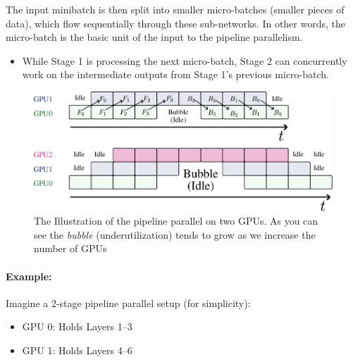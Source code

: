 {The input minibatch is then split into smaller micro-batches (smaller pieces of data), which flow sequentially through these sub-networks. In other words, the micro-batch is the basic unit of the input to the pipeline parallelism. 
\begin{itemize}
	\item While Stage 1 is processing the next micro-batch, Stage 2 can concurrently work on the intermediate outputs from Stage 1's previous micro-batch.
\end{itemize}

\begin{figure}[t]
	\centering
	\includegraphics[scale=0.8]{./images/pipeline.pdf}
	\caption{The Illustration of the pipeline parallel on two GPUs. As you can see the \textit{bubble} (\ie underutilization) tends to grow as we increase the number of GPUs}
\end{figure}

\paragraph{Example:} Imagine a 2-stage pipeline parallel setup (for simplicity):

\begin{itemize}
	\item GPU 0: Holds Layers 1–3  
	\item GPU 1: Holds Layers 4–6  
\end{itemize}

}
